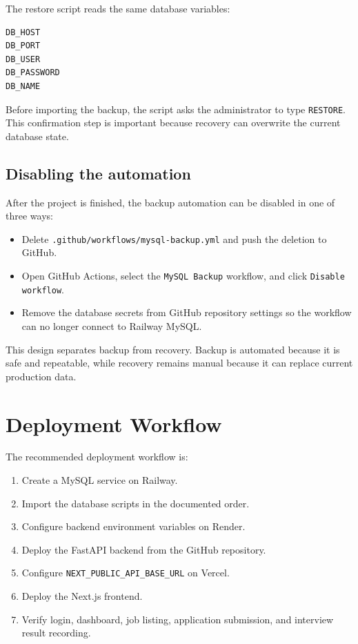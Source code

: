 \documentclass[11pt,a4paper]{report}
\begin{document}
The restore script reads the same database variables:

\begin{lstlisting}[caption={Environment variables required for recovery}]
DB_HOST
DB_PORT
DB_USER
DB_PASSWORD
DB_NAME
\end{lstlisting}

Before importing the backup, the script asks the administrator to type \texttt{RESTORE}. This confirmation step is important because recovery can overwrite the current database state.

\subsection*{Disabling the automation}

After the project is finished, the backup automation can be disabled in one of three ways:

\begin{itemize}[leftmargin=1.2cm,itemsep=0.1em]
  \item Delete \texttt{.github/workflows/mysql-backup.yml} and push the deletion to GitHub.
  \item Open GitHub Actions, select the \texttt{MySQL Backup} workflow, and click \texttt{Disable workflow}.
  \item Remove the database secrets from GitHub repository settings so the workflow can no longer connect to Railway MySQL.
\end{itemize}

This design separates backup from recovery. Backup is automated because it is safe and repeatable, while recovery remains manual because it can replace current production data.

\section{Deployment Workflow}

The recommended deployment workflow is:

\begin{enumerate}[leftmargin=1.5cm]
  \item Create a MySQL service on Railway.
  \item Import the database scripts in the documented order.
  \item Configure backend environment variables on Render.
  \item Deploy the FastAPI backend from the GitHub repository.
  \item Configure \texttt{NEXT\_PUBLIC\_API\_BASE\_\allowbreak{}URL} on Vercel.
  \item Deploy the Next.js frontend.
  \item Verify login, dashboard, job listing, application submission, and interview result recording.
\end{enumerate}
\end{document}
